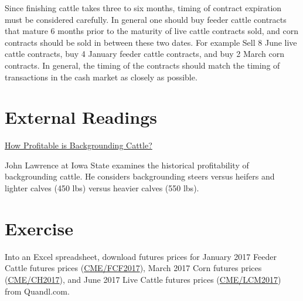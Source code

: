 \documentclass[
  letterpaper,
  DIV=11,
  numbers=noendperiod]{scrreprt}
\begin{document}
Since finishing cattle takes three to six months, timing of contract
expiration must be considered carefully. In general one should buy
feeder cattle contracts that mature 6 months prior to the maturity of
live cattle contracts sold, and corn contracts should be sold in between
these two dates. For example Sell 8 June live cattle contracts, buy 4
January feeder cattle contracts, and buy 2 March corn contracts. In
general, the timing of the contracts should match the timing of
transactions in the cash market as closely as possible.

\hypertarget{external-readings}{%
\section{External Readings}\label{external-readings}}

\href{http://www2.econ.iastate.edu/faculty/lawrence/Acrobat/Backgrounding\%20Cattle.pdf}{How
Profitable is Backgrounding Cattle?}

John Lawrence at Iowa State examines the historical profitability of
backgrounding cattle. He considers backgrounding steers versus heifers
and lighter calves (450 lbs) versus heavier calves (550 lbs).

\hypertarget{exercise}{%
\section{Exercise}\label{exercise}}

Into an Excel spreadsheet, download futures prices for January 2017
Feeder Cattle futures prices
(\href{https://www.quandl.com/data/CME/FCF2017}{CME/FCF2017}), March
2017 Corn futures prices
(\href{https://www.quandl.com/data/CME/CH2017}{CME/CH2017}), and June
2017 Live Cattle futures prices
(\href{https://www.quandl.com/data/CME/LCM2017}{CME/LCM2017}) from
Quandl.com.
\end{document}
